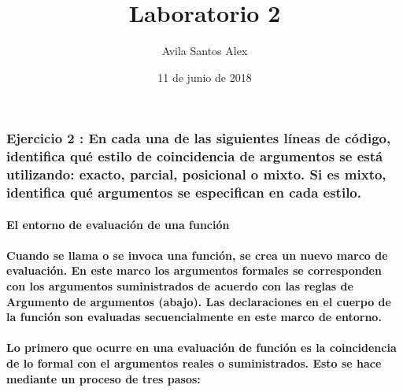 \documentclass[]{article}
\title{Laboratorio 2}
\author{Avila Santos Alex}
\date{11 de junio de 2018}
\let\oldparagraph\paragraph
\renewcommand{\paragraph}[1]{\oldparagraph{#1}\mbox{}}
\begin{document}
\maketitle

\subsubsection{Ejercicio 2 : En cada una de las siguientes líneas de
código, identifica qué estilo de coincidencia de argumentos se está
utilizando: exacto, parcial, posicional o mixto. Si es mixto, identifica
qué argumentos se especifican en cada
estilo.}\label{ejercicio-2-en-cada-una-de-las-siguientes-lineas-de-codigo-identifica-que-estilo-de-coincidencia-de-argumentos-se-esta-utilizando-exacto-parcial-posicional-o-mixto.-si-es-mixto-identifica-que-argumentos-se-especifican-en-cada-estilo.}

\paragraph{El entorno de evaluación de una
función}\label{el-entorno-de-evaluacion-de-una-funcion}

\paragraph{Cuando se llama o se invoca una función, se crea un nuevo
marco de evaluación. En este marco los argumentos formales se
corresponden con los argumentos suministrados de acuerdo con las reglas
de Argumento de argumentos (abajo). Las declaraciones en el cuerpo de la
función son evaluadas secuencialmente en este marco de
entorno.}\label{cuando-se-llama-o-se-invoca-una-funcion-se-crea-un-nuevo-marco-de-evaluacion.-en-este-marco-los-argumentos-formales-se-corresponden-con-los-argumentos-suministrados-de-acuerdo-con-las-reglas-de-argumento-de-argumentos-abajo.-las-declaraciones-en-el-cuerpo-de-la-funcion-son-evaluadas-secuencialmente-en-este-marco-de-entorno.}

\paragraph{Lo primero que ocurre en una evaluación de función es la
coincidencia de lo formal con el argumentos reales o suministrados. Esto
se hace mediante un proceso de tres
pasos:}\label{lo-primero-que-ocurre-en-una-evaluacion-de-funcion-es-la-coincidencia-de-lo-formal-con-el-argumentos-reales-o-suministrados.-esto-se-hace-mediante-un-proceso-de-tres-pasos}
\end{document}

